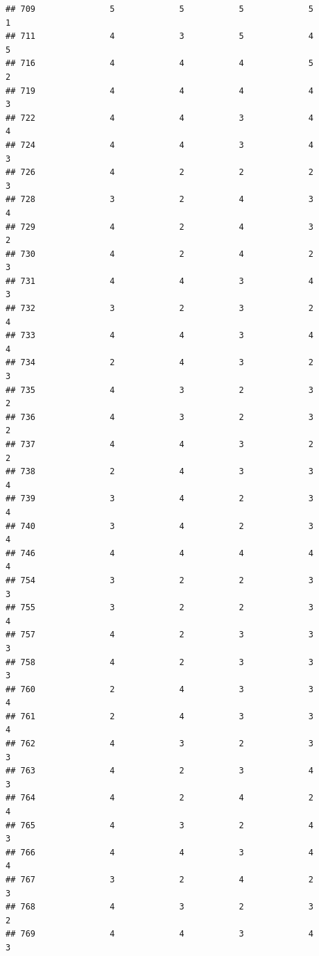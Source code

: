 \documentclass[
]{article}
\begin{document}
\begin{verbatim}
## 709               5             5           5             5            1
## 711               4             3           5             4            5
## 716               4             4           4             5            2
## 719               4             4           4             4            3
## 722               4             4           3             4            4
## 724               4             4           3             4            3
## 726               4             2           2             2            3
## 728               3             2           4             3            4
## 729               4             2           4             3            2
## 730               4             2           4             2            3
## 731               4             4           3             4            3
## 732               3             2           3             2            4
## 733               4             4           3             4            4
## 734               2             4           3             2            3
## 735               4             3           2             3            2
## 736               4             3           2             3            2
## 737               4             4           3             2            2
## 738               2             4           3             3            4
## 739               3             4           2             3            4
## 740               3             4           2             3            4
## 746               4             4           4             4            4
## 754               3             2           2             3            3
## 755               3             2           2             3            4
## 757               4             2           3             3            3
## 758               4             2           3             3            3
## 760               2             4           3             3            4
## 761               2             4           3             3            4
## 762               4             3           2             3            3
## 763               4             2           3             4            3
## 764               4             2           4             2            4
## 765               4             3           2             4            3
## 766               4             4           3             4            4
## 767               3             2           4             2            3
## 768               4             3           2             3            2
## 769               4             4           3             4            3

\end{verbatim}
\end{document}

